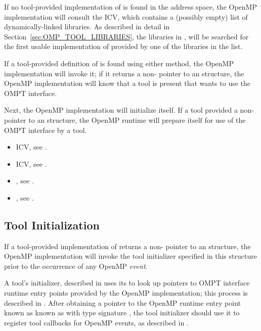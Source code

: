 If no tool-provided implementation of  is found in
the address space, the OpenMP implementation will consult the
 ICV, which contains a (possibly empty) list
of dynamically-linked libraries.  As described in detail in
Section~\ref{sec:OMP_TOOL_LIBRARIES}, the libraries in
, will be searched for the first usable
implementation of  provided by one of the libraries
in the list.

If a tool-provided definition of  is found using
either method, the OpenMP implementation will invoke it; if it returns
a non- pointer to an  structure, 
the OpenMP implementation will know
that a tool is present that wants to use the OMPT interface.

Next, the OpenMP implementation will initialize itself. If a tool
provided a non- pointer to an  structure,
the OpenMP runtime will prepare itself for use of the OMPT interface by a tool. 

\crossreferences
\begin{itemize}
\item {} ICV, see .
\item {} ICV, see .
\item {}, see .
\item {}, see .
\end{itemize}

\subsection{Tool Initialization}
\label{sec:tool-initialize}

If a tool-provided implementation of  returns a
non- pointer to an  structure,
the OpenMP implementation will invoke the tool initializer specified
in this structure prior to the occurrence of any OpenMP \emph{event}. 

A tool's initializer, described in 
uses its \callbackarg{}  to look up pointers
to OMPT interface runtime entry points provided by the OpenMP
implementation; this process is described in .
After obtaining a pointer to the OpenMP runtime entry point known as
known as  with type signature
, the tool initializer should use it to
register tool callbacks for OpenMP events, as described in
.

